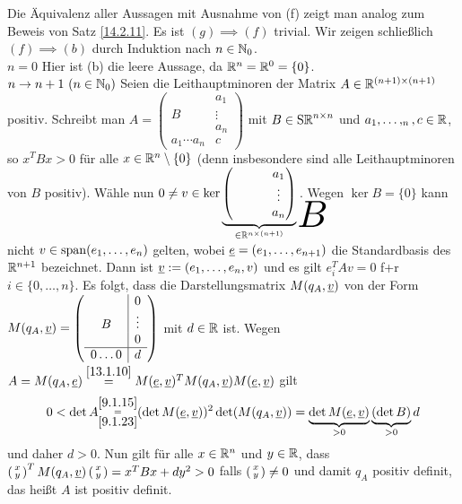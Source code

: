 \documentclass[../../main.tex]{subfiles}
\begin{document}
\begin{cproof}
Die Äquivalenz aller Aussagen mit Ausnahme von (f) zeigt man analog zum Beweis von Satz \ref{14.2.11}. Es ist $(g)\implies (f)$ trivial. Wir zeigen schließlich $(f)\implies (b)$ durch Induktion nach $n\in\mathbb N_0$.\\

\noindent\underline{$n=0$} Hier ist (b) die leere Aussage, da $\mathbb R^n=\mathbb R^0=\{0\}$.\\
\noindent\underline{$n\to n+1\ (n\in\mathbb N_0)$} 
    Seien die Leithauptminoren der Matrix $A\in\mathbb R^{(n+1)\times(n+1)}$ positiv. Schreibt man $A=\left(
        \begin{array}{c|c}
            & a_1\\
            B & \vdots\\
            & a_n\\
            \hline 
            a_1\cdots  a_n & c
        \end{array}
    \right)$ mit $B\in \operatorname{S\mathbb R}^{n\times n}$ und $a_1,\ldots ,_n,c\in \mathbb R$, so $x^TBx>0$ für alle $x\in\mathbb R^{n}\setminus\{0\}$ (denn insbesondere sind alle Leithauptminoren von $B$ positiv). Wähle nun $0\neq v\in\ker\underbrace{\begin{pmatrix}
        \tikz\node[inner sep=0pt] (a) { };&&&a_1
        \\&&&\vdots
        \\&&&a_n
    \end{pmatrix}}_{\in \R^{n\times(n+1)}}
    \begin{tikzpicture}[overlay]
        \node at (a.north) [anchor=center,yshift=-0.5cm, xshift=0.4cm, scale=3] {$B$};
    \end{tikzpicture}$. Wegen $\ker B=\{0\}$ kann nicht $v\in\operatorname{span}(e_1,\ldots ,e_n)$ gelten, wobei ${\underline e}=(e_1,\ldots ,e_{n+1})$ die Standardbasis des $\mathbb R^{n+1}$ bezeichnet. Dann ist ${\underline v}:=(e_1,\ldots ,e_n,v)$ und es gilt $e_i^TAv=0$ f+r $i\in\{0,\ldots ,n\}$. Es folgt, dass die Darstellungsmatrix $M(q_A,{\underline v})$ von der Form $M(q_A,{\underline v})=\left(
        \begin{array}{c|c}
            & 0\\
            B & \vdots\\
            & 0 \\
            \hline 
            0\ldots 0 & d
        \end{array}\right)$ mit $d\in\mathbb R$ ist. Wegen $A=M(q_A,{\underline e})\stackrel{\ref{13.1.10}}{=}M({\underline e},{\underline v})^TM(q_A,{\underline v})M({\underline e},{\underline v})$ gilt
    \begin{align*}
        0<\det A\substack{\ref{9.1.15}\\=\\\ref{9.1.23}}(\det M({\underline e},{\underline v}))^2\det(M(q_A,{\underline v}))=\underbrace{\det M({\underline e},{\underline v})}_{>0}\underbrace{(\det B)}_{>0}d
    \end{align*}
    und daher $d>0$. Nun gilt für alle $x\in \mathbb R^n$ und $y\in \mathbb R$, dass $\left(\begin{smallmatrix}x\\y\end{smallmatrix}\right)^TM(q_A,{\underline v})\left(\begin{smallmatrix}x\\y\end{smallmatrix}\right)=x^TBx+dy^2>0$ falls $\left(\begin{smallmatrix}x\\y\end{smallmatrix}\right)\neq 0$ und damit $q_A$ positiv definit, das heißt $A$ ist positiv definit.
\end{cproof}
\end{document}
